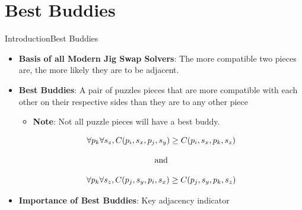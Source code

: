 \documentclass[10pt]{beamer}
\begin{document}
\section{Best Buddies}
\begin{frame}{Introduction}{Best Buddies}\label{frame:bestBuddies}
    \begin{itemize}
        \item \textbf{Basis of all Modern Jig Swap Solvers}: The more compatible two pieces are, the more likely they are to be adjacent.
        \vfill
        \item \textbf{Best Buddies}: A pair of puzzles pieces that are more compatible with each other on their respective sides than they are to any other piece~\cite{pomeranz2011}
        \begin{itemize}
          \item \textbf{Note}: Not all puzzle pieces will have a best buddy.
        \end{itemize}
        \vfill
				\begin{equation}\label{eq:pomeranzBestBuddyDefinition}
					\centering
					\begin{split}
						\begin{matrix}
								\forall{p_{k}}\forall{s_z},C(p_i, s_x, p_j, s_y) \geq C(p_i, s_x, p_k, s_z)
								\\
								\\
								\textnormal{and}
								\\
								\\
								\forall{p_{k}}\forall{s_z},C(p_j, s_y, p_i, s_x) \geq C(p_j, s_y, p_k, s_z)
						\end{matrix}
					\end{split}
				\end{equation} 
        \vfill
        \item \textbf{Importance of Best Buddies}: Key adjacency indicator
    \end{itemize}
\end{frame}
\end{document}

